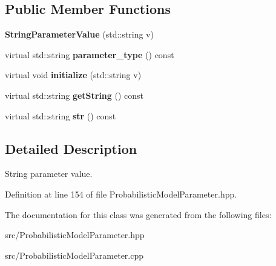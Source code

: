 \subsection*{Public Member Functions}
\begin{DoxyCompactItemize}
\item 
\mbox{\label{classtops_1_1StringParameterValue_af23eb972446e833e85b47de40c6286a3}} 
{\bfseries String\+Parameter\+Value} (std\+::string v)
\item 
\mbox{\label{classtops_1_1StringParameterValue_a68a4d2ebe385e821a14c9f1b9be68ba7}} 
virtual std\+::string {\bfseries parameter\+\_\+type} () const
\item 
\mbox{\label{classtops_1_1StringParameterValue_a29fd948a162ddf450f351ad621a12e34}} 
virtual void {\bfseries initialize} (std\+::string v)
\item 
\mbox{\label{classtops_1_1StringParameterValue_a2997f7a7532dd21b5b64f4b3517891b7}} 
virtual std\+::string {\bfseries get\+String} () const
\item 
\mbox{\label{classtops_1_1StringParameterValue_ad99dd55a28537e7c6c8ba7a1043bc3ca}} 
virtual std\+::string {\bfseries str} () const
\end{DoxyCompactItemize}


\subsection{Detailed Description}
String parameter value. 

Definition at line 154 of file Probabilistic\+Model\+Parameter.\+hpp.



The documentation for this class was generated from the following files\+:\begin{DoxyCompactItemize}
\item 
src/Probabilistic\+Model\+Parameter.\+hpp\item 
src/Probabilistic\+Model\+Parameter.\+cpp\end{DoxyCompactItemize}
